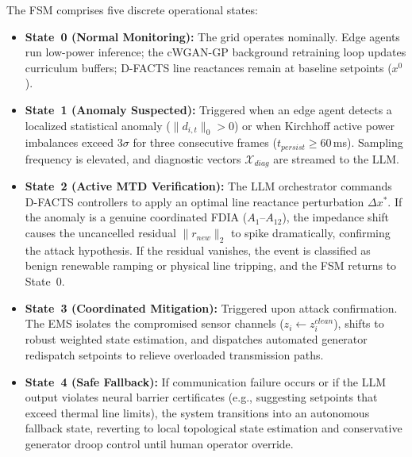\documentclass[journal,compsoc]{IEEEtran}
\begin{document}
The FSM comprises five discrete operational states:
\begin{itemize}
    \item \textbf{State~0 (Normal Monitoring):} The grid operates nominally. Edge agents run low-power inference; the cWGAN-GP background retraining loop updates curriculum buffers; D-FACTS line reactances remain at baseline setpoints ($x^0$).
    \item \textbf{State~1 (Anomaly Suspected):} Triggered when an edge agent detects a localized statistical anomaly ($\|d_{i,t}\|_0 > 0$) or when Kirchhoff active power imbalances exceed $3\sigma$ for three consecutive frames ($t_{persist} \ge 60$\,ms). Sampling frequency is elevated, and diagnostic vectors $\mathcal{X}_{diag}$ are streamed to the LLM.
    \item \textbf{State~2 (Active MTD Verification):} The LLM orchestrator commands D-FACTS controllers to apply an optimal line reactance perturbation $\Delta x^*$. If the anomaly is a genuine coordinated FDIA ($A_1$--$A_{12}$), the impedance shift causes the uncancelled residual $\|r_{new}\|_2$ to spike dramatically, confirming the attack hypothesis. If the residual vanishes, the event is classified as benign renewable ramping or physical line tripping, and the FSM returns to State~0.
    \item \textbf{State~3 (Coordinated Mitigation):} Triggered upon attack confirmation. The EMS isolates the compromised sensor channels ($z_i \leftarrow z_i^{clean}$), shifts to robust weighted state estimation, and dispatches automated generator redispatch setpoints to relieve overloaded transmission paths.
    \item \textbf{State~4 (Safe Fallback):} If communication failure occurs or if the LLM output violates neural barrier certificates (e.g., suggesting setpoints that exceed thermal line limits), the system transitions into an autonomous fallback state, reverting to local topological state estimation and conservative generator droop control until human operator override.
\end{itemize}
\end{document}
